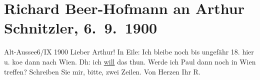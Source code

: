 

         
         \renewcommand{\erwaehntePersonen}{Personen: Paul Goldmann}
         \renewcommand{\erwaehnteOrte}{Orte: Altaussee, Wien}
         \renewcommand{\erwaehnteWerke}{}
               \section[Richard Beer-Hofmann an Arthur Schnitzler, 6. 9. 1900]{ Richard Beer-Hofmann an Arthur Schnitzler, 6. 9. 1900}\nopagebreak{}\rehead{ }\begin{ledgroupsized}[t]{13cm}\normalsize\beginnumbering \toendnotes[C]{\smallbreak\pagebreak[2]} 
\pstart
           \raggedleft{}{\pb}Alt-Aussee6/IX 1900\pend
           \pstart
           Lieber Arthur! In Eile: Ich bleibe noch bis ungefähr 18. hier u.
                  ko{\geminationm}e dann nach Wien. Dh: ich \uline{will} das thun. Werde ich Paul dann noch in Wien treffen?\pend
           \pstart
           Schreiben Sie mir, bitte, zwei Zeilen.\pend
           \pstart Von Herzen Ihr \spacefill\mbox{R.}\pend{}
         
         \endnumbering{}\end{ledgroupsized}  \newcommand{\dateiname}{L01071}\newcommand{\titel}{Richard Beer-Hofmann an Arthur Schnitzler, 6. 9. 1900}\newcommand{\editorInnen}{Martin Anton Müller und Gerd-Hermann Susen}
      